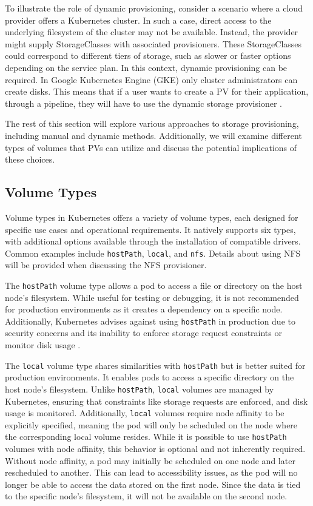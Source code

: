 To illustrate the role of dynamic provisioning, consider a scenario where a cloud provider offers a Kubernetes cluster. In such a case, direct access to the underlying filesystem of the cluster may not be available. Instead, the provider might supply StorageClasses with associated provisioners. These StorageClasses could correspond to different tiers of storage, such as slower or faster options depending on the service plan. In this context, dynamic provisioning can be required. In Google Kubernetes Engine (GKE) only cluster administrators can create disks. This means that if a user wants to create a PV for their application, through a pipeline, they will have to use the dynamic storage provisioner \cite{googlek8spv}. 

The rest of this section will explore various approaches to storage provisioning, including manual and dynamic methods. Additionally, we will examine different types of volumes that PVs can utilize and discuss the potential implications of these choices.

\subsection{Volume Types} 
Volume types in Kubernetes offers a variety of volume types, each designed for specific use cases and operational requirements. It natively supports six types, with additional options available through the installation of compatible drivers. Common examples include \texttt{hostPath}, \texttt{local}, and \texttt{nfs}. Details about using NFS will be provided when discussing the NFS provisioner.

The \texttt{hostPath} volume type allows a pod to access a file or directory on the host node's filesystem. While useful for testing or debugging, it is not recommended for production environments as it creates a dependency on a specific node. Additionally, Kubernetes advises against using \texttt{hostPath} in production due to security concerns and its inability to enforce storage request constraints or monitor disk usage \cite{kubernetes_hostpath}.

The \texttt{local} volume type shares similarities with \texttt{hostPath} but is better suited for production environments. It enables pods to access a specific directory on the host node's filesystem. Unlike \texttt{hostPath}, \texttt{local} volumes are managed by Kubernetes, ensuring that constraints like storage requests are enforced, and disk usage is monitored. Additionally, \texttt{local} volumes require node affinity to be explicitly specified, meaning the pod will only be scheduled on the node where the corresponding local volume resides. While it is possible to use \texttt{hostPath} volumes with node affinity, this behavior is optional and not inherently required. Without node affinity, a pod may initially be scheduled on one node and later rescheduled to another. This can lead to accessibility issues, as the pod will no longer be able to access the data stored on the first node. Since the data is tied to the specific node's filesystem, it will not be available on the second node. 

